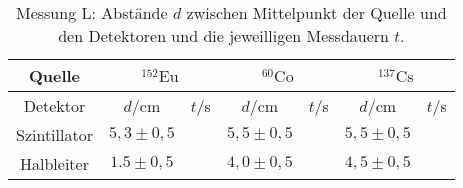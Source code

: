 \documentclass[ngerman,11pt]{article}
\begin{document}
\begin{table}
	\centering
	\begin{tabular}{|c|c|c|c|c|c|c|}
		\hline
		Quelle & \multicolumn{2}{|c|}{$^{152}\mathrm{Eu}$}&\multicolumn{2}{|c|}{$^{60}\mathrm{Co}$}&\multicolumn{2}{|c|}{$^{137}\mathrm{Cs}$}\\ \hline
		Detektor& $d$/cm & $t$/s& $d$/cm & $t$/s& $d$/cm & $t$/s\\ \hline
		Szintillator & $5,3\pm0,5$ & & $5,5\pm 0,5$ & & $5,5\pm0,5$ & \\ \hline
		Halbleiter & $1.5\pm0,5$ & & $4,0\pm 0,5$ & & $4,5\pm0,5$ & \\ \hline
	\end{tabular}
	\caption{Messung L: Abst\"ande $d$ zwischen Mittelpunkt der Quelle und den Detektoren und die jeweilligen Messdauern $t$.}
\end{table}
\end{document}
